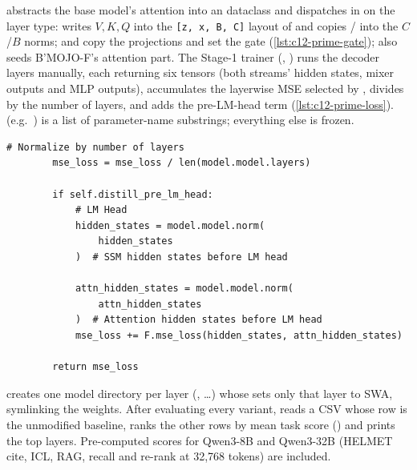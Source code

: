 \begin{implnote}[title={In the code: initialization and distillation}]
 abstracts the base model's attention into
an  dataclass and dispatches in  on the layer type:
 writes $V,K,Q$ into the \texttt{[z, x, B, C]} layout of  and copies
/ into the $C$/$B$ norms;  and
 copy the projections and set the gate (\cref{lst:c12-prime-gate});
 also seeds B'MOJO-F's attention part. The Stage-1 trainer
(, ) runs the decoder
layers manually, each returning six tensors (both streams' hidden states, mixer outputs and MLP
outputs), accumulates the layerwise MSE selected by , divides by
the number of layers, and adds the pre-LM-head term (\cref{lst:c12-prime-loss}).
 (e.g.\ ) is a list of parameter-name substrings; everything
else is frozen.
\end{implnote}

\begin{lstlisting}[caption={Excerpt from \texttt{repos/\allowbreak awslabs\_\_hybrid-model-factory/\allowbreak training/\allowbreak src/\allowbreak hmf/\allowbreak train/\allowbreak hkd/\allowbreak trainer.py} (end of \texttt{compute\_lw\_mse\_loss}).},label={lst:c12-prime-loss}]
        # Normalize by number of layers
        mse_loss = mse_loss / len(model.model.layers)

        if self.distill_pre_lm_head:
            # LM Head
            hidden_states = model.model.norm(
                hidden_states
            )  # SSM hidden states before LM head

            attn_hidden_states = model.model.norm(
                attn_hidden_states
            )  # Attention hidden states before LM head
            mse_loss += F.mse_loss(hidden_states, attn_hidden_states)

        return mse_loss
\end{lstlisting}

\begin{implnote}[title={In the code: layer selection}]
 creates one model directory per layer
(, \dots) whose  sets only that layer to SWA, symlinking the
weights. After evaluating every variant, 
reads a CSV whose row  is the unmodified baseline, ranks the other rows by mean
task score () and prints the top  layers. Pre-computed scores for
Qwen3-8B and Qwen3-32B (HELMET cite, ICL, RAG, recall and re-rank at 32,768 tokens) are included.
\end{implnote}


